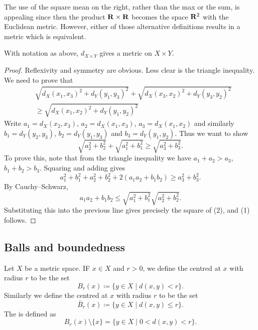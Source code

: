 The use of the square mean on the right, rather than the max or the sum, is appealing since then the product $\mathbf R\times\mathbf R$ becomes the space $\mathbf R^2$ with the Euclidean metric. However, either of those alternative definitions results in a metric which is equivalent.

\begin{proposition}
With notation as above, $d_{X\times Y}$ gives a metric on $X\times Y$.
\end{proposition}

\begin{proof}
Reflexivity and symmetry are obvious. Less clear is the triangle inequality. We need to prove that
\begin{equation*}\tag{1}
\begin{split}
&\sqrt{d_X(x_1,x_3)^2+d_Y(y_1,y_3)^2}+\sqrt{d_X(x_3,x_2)^2+d_Y(y_3,y_2)^2}\\
&\ge\sqrt{d_X(x_1,x_2)^2+d_Y(y_1,y_2)^2}
\end{split}
\end{equation*}
Write $a_1=d_X(x_2,x_3)$, $a_2=d_X(x_1,x_3)$, $a_3=d_X(x_1,x_2)$ and similarly $b_1=d_Y(y_2,y_3)$, $b_2=d_Y(y_1,y_3)$ and $b_3=d_Y(y_1,y_2)$. Thus we want to show
\begin{equation*}\tag{2}
\sqrt{a_2^2+b_2^2}+\sqrt{a_1^2+b_1^2}\ge\sqrt{a_3^2+b_3^2}.
\end{equation*}
To prove this, note that from the triangle inequality we have $a_1+a_2>a_3$, $b_1+b_2>b_3$. Squaring and adding gives
\[a_1^2+b_1^2+a_2^2+b_2^2+2(a_1a_2+b_1b_2)\ge a_3^2+b_3^2.\]
By Cauchy--Schwarz,
\[a_1a_2+b_1b_2\le\sqrt{a_1^2+b_1^2}\sqrt{a_2^2+b_2^2}.\]
Substituting this into the previous line gives precisely the square of (2), and (1) follows.
\end{proof}

\subsection{Balls and boundedness}
\begin{definition}[Balls]
Let $X$ be a metric space. IF $x\in X$ and $r>0$, we define the  centred at $x$ with radius $r$ to be the set
\[B_r(x)\coloneqq\{y\in X\mid d(x,y)<r\}.\]
Similarly we define the  centred at $x$ with radius $r$ to be the set
\[\bar{B}_r(x)\coloneqq\{y\in X\mid d(x,y)\le r\}.\]
The  is defined as
\[B_r(x)\setminus\{x\}=\{y\in X\mid 0<d(x,y)<r\}.\]
\end{definition}


